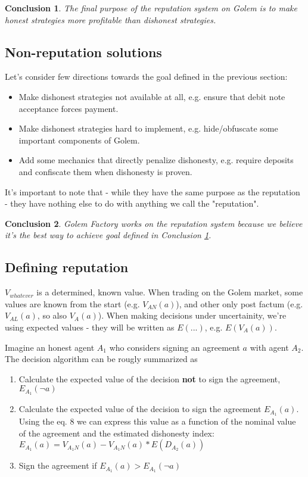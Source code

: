 \documentclass{article}
\newtheorem{conclusion}{Conclusion}[section]
\begin{document}
\begin{conclusion}

The final purpose of the reputation system on Golem is to make honest strategies more profitable than dishonest strategies.

\label{main purpose conclusion}
\end{conclusion}


\subsection{Non-reputation solutions}

Let's consider few directions towards the goal defined in the previous section:

\begin{itemize}
\item{Make dishonest strategies not available at all, e.g. ensure that debit note acceptance forces payment.}
\item{Make dishonest strategies hard to implement, e.g. hide/obfuscate some important components of Golem.}
\item{Add some mechanics that directly penalize dishonesty, e.g. require deposits and confiscate them when dishonesty is proven.}
\end{itemize}

It's important to note that - while they have the same purpose as the reputation - they have nothing else to do with anything we call the "reputation".

\begin{conclusion}
Golem Factory works on the reputation system because we believe it's the best way to achieve goal defined in Conclusion \ref{main purpose conclusion}.
\end{conclusion}

\subsection{Defining reputation}

$V_{whatever}$ is a determined, known value. When trading on the Golem market, some values are known from the start (e.g. $V_{AN}(a)$), 
and other only post factum (e.g. $V_{AL}(a)$, so also $V_A(a)$).
When making decisions under uncertainity, we're using expected values - they will be written as $E(...)$, e.g. $E(V_A(a))$.

Imagine an honest agent $A_1$ who considers signing an agreement $a$ with agent $A_2$. The decision algorithm can be rougly summarized as
\begin{enumerate}
\item{Calculate the expected value of the decision \textbf{not} to sign the agreement, $E_{A_1}(\neg a)$}
\item{Calculate the expected value of the decision to sign the agreement $E_{A_1}(a)$.
    Using the eq. 8 we can express this value as a function of the nominal value of the agreement and the
    estimated dishonesty index: $E_{A_1}(a) = V_{A_1N}(a) - V_{A_1N}(a) * E(D_{A_2}(a))$}
\item{Sign the agreement if $E_{A_1}(a) > E_{A_1}(\neg a)$}
\end{enumerate}
\end{document}
